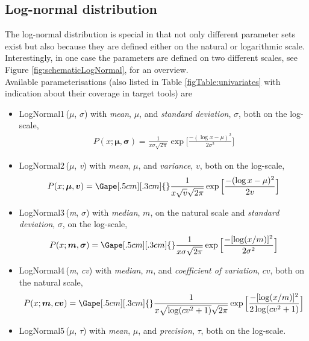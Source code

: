 {\subsection{Log-normal distribution}
\label{subsec:logNormalForms}
The log-normal distribution is special in that not only different parameter sets exist
but also because they are defined either on the natural or logarithmic scale. Interestingly, in one 
case the parameters are defined on two different scales, see Figure \ref{fig:schematicLogNormal},
for an overview.\\
Available parameterisations (also listed in Table \ref{figTable:univariates} 
with indication about their coverage in target tools) are 
\begin{itemize}
\item
LogNormal1\,($\mu$, $\sigma$) with \emph{mean}, $\mu$, and \emph{standard deviation}, $\sigma$, both on the log-scale, 
\begin{align*}
P(x;\boldsymbol\mu,\boldsymbol\sigma)= \frac{1}{x \sigma \sqrt{2 \pi}} \exp\Big[ \frac{-(\log x - \mu)^2}{2\sigma^2}\Big]
\end{align*}
\item
LogNormal2\,($\mu$, \textit{v}) with \emph{mean}, $\mu$, and \emph{variance}, $v$, both on the log-scale, 
\begin{align*}
P(x;\boldsymbol\mu,\boldsymbol {v})=\Gape[.5cm][.3cm]{} \frac{1}{x \sqrt{v} \sqrt{2 \pi}} \exp\Big[ \frac{-(\log x - \mu)^2}{2 v}\Big]
\end{align*}
\item
LogNormal3\,(\textit{m}, $\sigma$)  with \emph{median}, $m$, on the natural scale and \emph{standard deviation}, $\sigma$, on the log-scale, 
\begin{align*}
P(x;\boldsymbol m,\boldsymbol \sigma) =\Gape[.5cm][.3cm]{} \frac{1}{x \sigma \sqrt{2 \pi}} \exp\Big[ \frac{-[\log(x/m)]^2}{2\sigma^2}\Big]
\end{align*}
\item
LogNormal4\,(\textit{m}, \textit{cv}) with \emph{median}, $m$, and \emph{coefficient of variation}, $cv$, both on the natural scale, 
\begin{align*}
P(x;\boldsymbol m,\boldsymbol {cv})=\Gape[.5cm][.3cm]{} \frac{1}{x \sqrt{\log(cv^2+1)} \sqrt{2 \pi}} \exp\Big[ \frac{-[\log(x/m)]^2}{2\log(cv^2+1)}\Big]
\end{align*}
\item
LogNormal5\,($\mu$, $\tau$) with \emph{mean}, $\mu$, and \emph{precision}, $\tau$, both on the log-scale.
\begin{align*}

\end{align*}
\end{itemize}}
